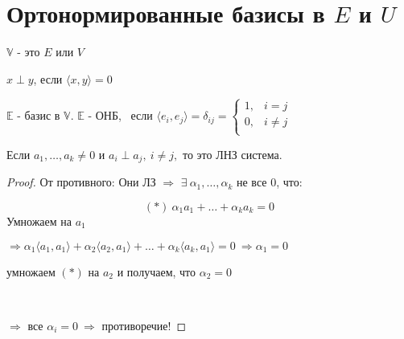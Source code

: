 \section{Ортонормированные базисы в $E$ и $U$}

$\mathbb{V}$ - это $E$ или $V$

\begin{shdef}
    \begin{definition}
        $x \perp y$, если $\langle x, y \rangle = 0$
    \end{definition}
    
    \begin{definition}
        $\mathbb{E}$ - базис в $\mathbb{V}$. \quad
        $\mathbb{E}$ - ОНБ, \ если $\langle e_{i}, e_{j} \rangle = \delta_{ij} = \begin{cases}
        1, & i = j \\
        0, & i \neq j \\
        \end{cases}$
    \end{definition}
\end{shdef}

\vspace{0.4cm}
\begin{shth}
    \begin{theorem}
        Если $a_{1}, \ldots, a_{k} \neq 0$ и $a_{i} \perp a_{j}, \ i \neq j,$ то это ЛНЗ система.
    \end{theorem}
\end{shth}

\begin{proof}
\leavevmode \newline

    От противного: Они ЛЗ $\Longrightarrow$ $\exists \ \alpha_{1}, \ldots, \alpha_{k}$ не все 0, что: 
\newline 

    $$(*) \ \alpha_{1} a_{1} + \ldots + \alpha_{k} a_{k} = 0$$
    Умножаем на $a_{1}$
    \newline
    
    $\Longrightarrow \alpha_{1} \langle a_{1}, a_{1} \rangle + \alpha_{2} \langle a_{2}, a_{1} \rangle + \ldots + \alpha_{k} \langle a_{k}, a_{1} \rangle = 0 \ \Longrightarrow \alpha_{1} = 0$
    \newline
    
    умножаем $(*)$ на $a_{2}$ и получаем, что $\alpha_{2} = 0$
    
    \
    
    $\Longrightarrow$ все $\alpha_{i} = 0 \ \Longrightarrow$ противоречие! 
\end{proof}
\vspace{0.6cm}

